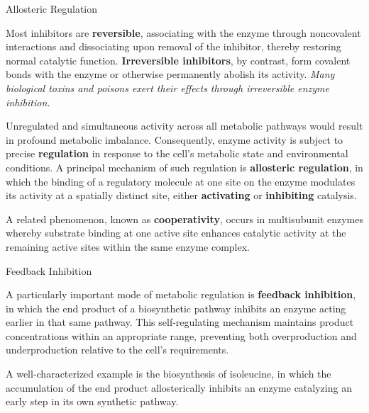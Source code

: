 \documentclass[10pt]{article}
\begin{document}
    \begin{core}{Allosteric Regulation}

      Most inhibitors are \textbf{reversible}, associating with the enzyme through noncovalent interactions and dissociating upon removal of the inhibitor, thereby restoring normal catalytic function. \textbf{Irreversible inhibitors}, by contrast, form covalent bonds with the enzyme or otherwise permanently abolish its activity. \textit{Many biological toxins and poisons exert their effects through irreversible enzyme inhibition.}

      Unregulated and simultaneous activity across all metabolic pathways would result in profound metabolic imbalance. Consequently, enzyme activity is subject to precise \textbf{regulation} in response to the cell's metabolic state and environmental conditions. A principal mechanism of such regulation is \textbf{allosteric regulation}, in which the binding of a regulatory molecule at one site on the enzyme modulates its activity at a spatially distinct site, either \textbf{activating} or \textbf{inhibiting} catalysis.


      A related phenomenon, known as \textbf{cooperativity}, occurs in multisubunit enzymes whereby substrate binding at one active site enhances catalytic activity at the remaining active sites within the same enzyme complex.


    \end{core}

    \begin{core}{Feedback Inhibition}

      A particularly important mode of metabolic regulation is \textbf{feedback inhibition}, in which the end product of a biosynthetic pathway inhibits an enzyme acting earlier in that same pathway. This self-regulating mechanism maintains product concentrations within an appropriate range, preventing both overproduction and underproduction relative to the cell's requirements.

      A well-characterized example is the biosynthesis of isoleucine, in which the accumulation of the end product allosterically inhibits an enzyme catalyzing an early step in its own synthetic pathway.


    \end{core}
\end{document}
